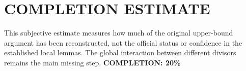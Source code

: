 \section{COMPLETION ESTIMATE}
This subjective estimate measures how much of the original upper-bound argument has been reconstructed, not the official status or confidence in the established local lemmas. The global interaction between different divisors remains the main missing step.
\textbf{COMPLETION: 20\%}
